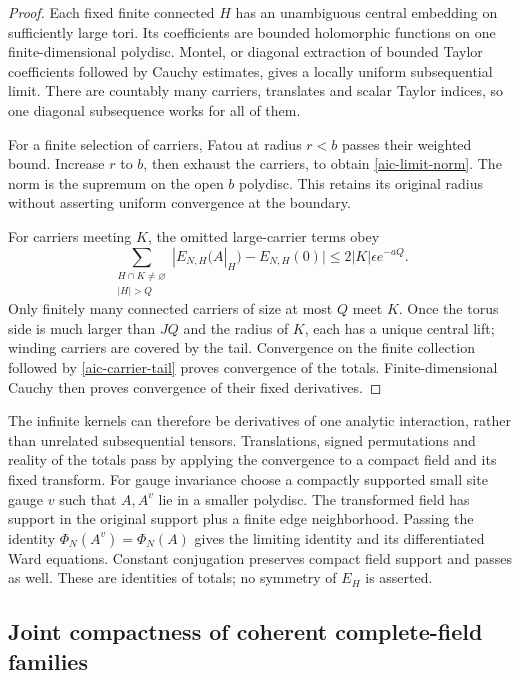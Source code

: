 \documentclass[11pt]{article}
\theoremstyle{remark}
\begin{document}
\begin{proof}
Each fixed finite connected \(H\) has an unambiguous central
embedding on sufficiently large tori. Its coefficients are bounded
holomorphic functions on one finite-dimensional polydisc. Montel,
or diagonal extraction of bounded Taylor coefficients followed by
Cauchy estimates, gives a locally uniform subsequential limit.
There are countably many carriers, translates and scalar Taylor
indices, so one diagonal subsequence works for all of them.

For a finite selection of carriers, Fatou at radius \(r<b\)
passes their weighted bound. Increase \(r\) to \(b\), then
exhaust the carriers, to obtain \eqref{aic-limit-norm}.
The norm is the supremum on the open \(b\) polydisc. This
retains its original radius without asserting uniform convergence
at the boundary.

For carriers meeting \(K\), the omitted large-carrier terms obey
\begin{equation}
 \sum_{\substack{H\cap K\ne\varnothing\\|H|>Q}}
 |E_{N,H}(A|_H)-E_{N,H}(0)|
       \le2|K|\epsilon e^{-aQ}.
 \label{aic-carrier-tail}
\end{equation}
Only finitely many connected carriers of size at most \(Q\)
meet \(K\). Once the torus side is much larger than \(JQ\)
and the radius of \(K\), each has a unique central lift;
winding carriers are covered by the tail. Convergence on the
finite collection followed by \eqref{aic-carrier-tail} proves
convergence of the totals. Finite-dimensional Cauchy then
proves convergence of their fixed derivatives.
\end{proof}

The infinite kernels can therefore be derivatives of one analytic
interaction, rather than unrelated subsequential tensors.
Translations, signed permutations and reality of the totals pass
by applying the convergence to a compact field and its fixed
transform. For gauge invariance choose a compactly supported
small site gauge \(v\) such that \(A,A^v\) lie in a smaller
polydisc. The transformed field has support in the original
support plus a finite edge neighborhood. Passing the identity
\(\Phi_N(A^v)=\Phi_N(A)\) gives the limiting identity and
its differentiated Ward equations. Constant conjugation preserves
compact field support and passes as well. These are identities
of totals; no symmetry of \(E_H\) is asserted.

\subsection{Joint compactness of coherent complete-field families}
\label{aic-background-section}
\end{document}
